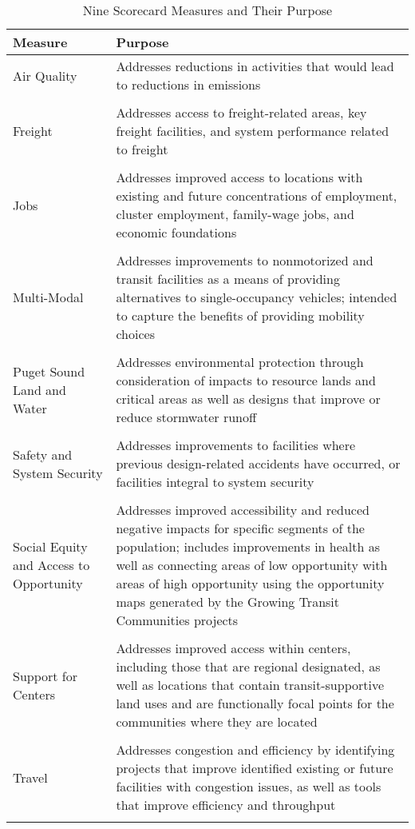 \documentclass[10pt, letterpaper, final, twoside, onecolumn]{memoir}%
\begin{document}
\begin{table}[htdp]
\caption{Nine Scorecard Measures and Their Purpose}
\begin{center}
\begin{tabularx}{\textwidth}{>{\raggedright\arraybackslash}p{8pc}>{\raggedright\arraybackslash}X}
\toprule
Measure	&	Purpose \\
\midrule
Air Quality	&	Addresses reductions in activities that would lead to reductions in emissions \\ \\
Freight	&	Addresses access to freight-related areas, key freight facilities, and system performance related to freight \\ \\
Jobs		&	Addresses improved access to locations with existing and future concentrations of employment, cluster employment, family-wage jobs, and economic foundations \\ \\
Multi-Modal	&	Addresses improvements to nonmotorized and transit facilities as a means of providing alternatives to single-occupancy vehicles; intended to capture the benefits of providing mobility choices \\ \\
Puget Sound Land and Water	&	Addresses environmental protection through consideration of impacts to resource lands and critical areas as well as designs that improve or reduce stormwater runoff \\ \\
Safety and System Security	&	Addresses improvements to facilities where previous design-related accidents have occurred, or facilities integral to system security \\ \\
Social Equity and Access to Opportunity	&	Addresses improved accessibility and reduced negative impacts for specific segments of the population; includes improvements in health as well as connecting areas of low opportunity with areas of high opportunity using the opportunity maps generated by the Growing Transit Communities projects \\ \\
Support for Centers	&	Addresses improved access within centers, including those that are regional designated, as well as locations that contain transit-supportive land uses and are functionally focal points for the communities where they are located \\ \\
Travel	&	Addresses congestion and efficiency by identifying projects that improve identified existing or future facilities with congestion issues, as well as tools that improve efficiency and throughput \\ \\

\bottomrule
\end{tabularx}
\end{center}
\label{tb:ninemeasures}
\end{table}%
\end{document}
